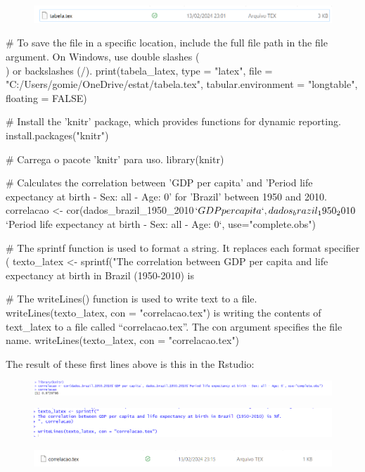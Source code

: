 \documentclass{article}
\begin{document}
\begin{figure}[H]
    \centering
    \includegraphics[width=1\linewidth]{imagesfolder/image20.png}
\end{figure}
\begin{spverbatim}
# To save the file in a specific location, include the full file path in the file argument. On Windows, use double slashes (\\) or backslashes (/).
print(tabela_latex, type = "latex", file = "C:/Users/gomie/OneDrive/estat/tabela.tex", tabular.environment = "longtable", floating = FALSE)

# Install the 'knitr' package, which provides functions for dynamic reporting.
install.packages("knitr")

# Carrega o pacote 'knitr' para uso.
library(knitr)

# Calculates the correlation between 'GDP per capita' and 'Period life expectancy at birth - Sex: all - Age: 0' for 'Brazil' between 1950 and 2010.
correlacao <- cor(dados_brazil_1950_2010$`GDP per capita`, dados_brazil_1950_2010$`Period life expectancy at birth - Sex: all - Age: 0`, use="complete.obs")

# The sprintf function is used to format a string. It replaces each format specifier (%
texto_latex <- sprintf("The correlation between GDP per capita and life expectancy at birth in Brazil (1950-2010) is %

# The writeLines() function is used to write text to a file. writeLines(texto_latex, con = "correlacao.tex") is writing the contents of text_latex to a file called “correlacao.tex”. The con argument specifies the file name.
writeLines(texto_latex, con = "correlacao.tex")

The result of these first lines above is this in the Rstudio:
\end{spverbatim}
\begin{figure}[H]
    \centering
    \includegraphics[width=1\linewidth]{imagesfolder/image23.png}
\end{figure}
\begin{figure}[H]
    \centering
    \includegraphics[width=1\linewidth]{imagesfolder/image21.png}
\end{figure}
\begin{figure}[H]
    \centering
    \includegraphics[width=1\linewidth]{imagesfolder/image22.png}
\end{figure}
\end{document}
